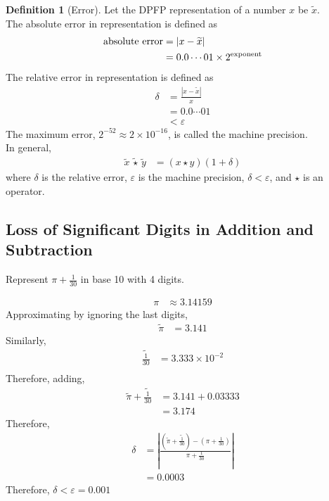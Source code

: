 \documentclass[fleqn, a4paper, 12pt, twoside, titlepage]{article}
\theoremstyle{definition}
\newtheorem{definition}{Definition}
\theoremstyle{theorem}
\renewcommand{\tilde}{\widetilde}
\begin{document}
\begin{definition}[Error]
	Let the DPFP representation of a number $x$ be $\tilde{x}$.\\
	The absolute error in representation is defined as
	\begin{align*}
		\textnormal{absolute error} & = \left| x - \tilde{x} \right| \\
                                            & = 0.0 \cdots 01 \times 2^{\text{exponent}}
	\end{align*}
	The relative error in representation is defined as
	\begin{align*}
		\delta & = \frac{\left| x - \tilde{x} \right|}{x} \\
                       & = 0.0 \cdots 01                          \\
                       & < \varepsilon
	\end{align*}
	The maximum error, $2^{-52} \approx 2 \times 10^{-16}$, is called the machine precision.\\
	In general,
	\begin{align*}
		\tilde{x} \, \tilde{\star} \, \tilde{y} & = \left( x \star y \right) \left( 1 + \delta \right)
	\end{align*}
	where $\delta$ is the relative error, $\varepsilon$ is the machine precision, $\delta < \varepsilon$, and $\star$ is an operator. 
\end{definition}

\subsection{Loss of Significant Digits in Addition and Subtraction}

\begin{question}
	Represent $\pi + \frac{1}{30}$ in base 10 with 4 digits.
\end{question}

\begin{solution}
	\begin{align*}
		\pi & \approx 3.14159
	\end{align*}
	Approximating by ignoring the last digits,
	\begin{align*}
		\tilde{\pi} & = 3.141
	\end{align*}
	Similarly,
	\begin{align*}
		\tilde{\frac{1}{30}} & = 3.333 \times 10^{-2} \\
	\end{align*}
	Therefore, adding,
	\begin{align*}
		\tilde{\pi} + \tilde{\frac{1}{30}} & = 3.141 + 0.03333 \\
                                                   & = 3.174
	\end{align*}
	Therefore,
	\begin{align*}
		\delta & = \left| \frac{\left( \tilde{\pi} + \tilde{\frac{1}{30}} \right) - \left( \pi + \frac{1}{30} \right)}{\pi + \frac{1}{30}} \right| \\
                       & = 0.0003
	\end{align*}
	Therefore, $\delta < \varepsilon = 0.001$
\end{solution}
\end{document}

